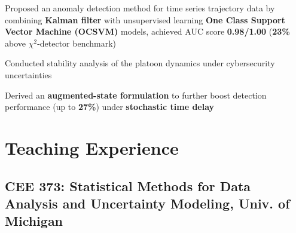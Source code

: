 \documentclass[]{Keval-resume}
\begin{document}
\begin{cvitems}
\item 
    {Proposed an anomaly detection method for time series trajectory data by combining \textbf{Kalman filter} with unsupervised learning \textbf{One Class Support Vector Machine (OCSVM)} models, achieved AUC score \textbf{0.98/1.00} (\textbf{23\%} above
    $\chi^2$-detector
    benchmark)}
\item
    {Conducted stability analysis of the platoon dynamics under cybersecurity uncertainties}
\item 
    {Derived an \textbf{augmented-state formulation} to further boost detection performance (up to \textbf{27\%}) under \textbf{stochastic time delay}}
\end{cvitems}
\sectionsep

\section{Teaching Experience} 
\hrulefill
\postsectionsep

\subsection{CEE 373: Statistical Methods for Data Analysis and Uncertainty Modeling,
Univ. of Michigan \hfill\normalfont}
\end{document}
